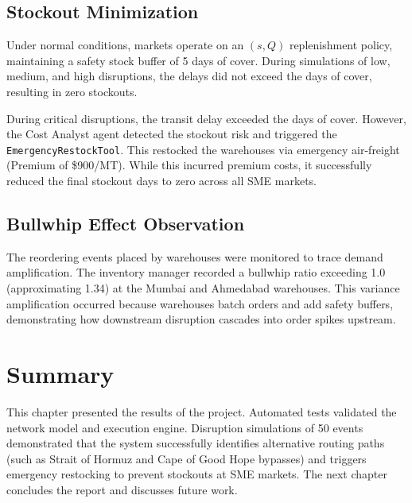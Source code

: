 \subsection{Stockout Minimization}
Under normal conditions, markets operate on an $(s, Q)$ replenishment policy, maintaining a safety stock buffer of 5 days of cover. During simulations of low, medium, and high disruptions, the delays did not exceed the days of cover, resulting in zero stockouts. 

During critical disruptions, the transit delay exceeded the days of cover. However, the Cost Analyst agent detected the stockout risk and triggered the \texttt{EmergencyRestockTool}. This restocked the warehouses via emergency air-freight (Premium of \$900/MT). While this incurred premium costs, it successfully reduced the final stockout days to zero across all SME markets.

\subsection{Bullwhip Effect Observation}
The reordering events placed by warehouses were monitored to trace demand amplification. The inventory manager recorded a bullwhip ratio exceeding 1.0 (approximating 1.34) at the Mumbai and Ahmedabad warehouses. This variance amplification occurred because warehouses batch orders and add safety buffers, demonstrating how downstream disruption cascades into order spikes upstream.

\section{Summary}
This chapter presented the results of the project. Automated tests validated the network model and execution engine. Disruption simulations of 50 events demonstrated that the system successfully identifies alternative routing paths (such as Strait of Hormuz and Cape of Good Hope bypasses) and triggers emergency restocking to prevent stockouts at SME markets. The next chapter concludes the report and discusses future work.
